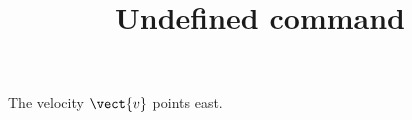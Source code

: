 \documentclass{handout}
\title{Undefined command}
\begin{document}
\maketitle

The velocity $\vect{v}$ points east.
\end{document}
